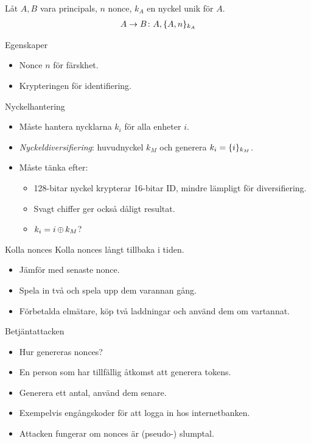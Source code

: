 \begin{frame}
  \begin{example}
    Låt \(A, B\) vara principals, \(n\) nonce, \(k_A\) en nyckel unik för 
    \(A\).
    \begin{align*}
      A\to B\colon A, \{A, n\}_{k_A}
    \end{align*}
  \end{example}
  \begin{block}{Egenskaper}
    \begin{itemize}
      \item Nonce \(n\) för färskhet.
      \item Krypteringen för identifiering.
    \end{itemize}
  \end{block}
\end{frame}

\begin{frame}{Nyckelhantering}
  \begin{itemize}
    \item Måste hantera nycklarna \(k_i\) för alla enheter \(i\).
    \item \emph{Nyckeldiversifiering}: huvudnyckel \(k_M\) och generera \(k_i 
      = \{i\}_{k_M}\).
    \item Måste tänka efter:
      \begin{itemize}
        \item 128-bitar nyckel krypterar 16-bitar ID, mindre lämpligt för 
          diversifiering.
        \item Svagt chiffer ger också dåligt resultat.
        \item \(k_i = i\operatorname{\oplus} k_M\)?
      \end{itemize}
  \end{itemize}
\end{frame}

\begin{frame}{Kolla nonces}
  Kolla nonces långt tillbaka i tiden.
  \begin{itemize}
    \item Jämför med senaste nonce.
    \item Spela in två och spela upp dem varannan gång.
    \item Förbetalda elmätare, köp två laddningar och använd dem om vartannat.
  \end{itemize}
\end{frame}

\begin{frame}{Betjäntattacken}
  \begin{itemize}
    \item Hur genereras nonces?
    \item En person som har tillfällig åtkomst att generera tokens.
    \item Generera ett antal, använd dem senare.
    \item Exempelvis engångskoder för att logga in hos internetbanken.
    \item Attacken fungerar om nonces är (pseudo-) slumptal.
  \end{itemize}
\end{frame}

